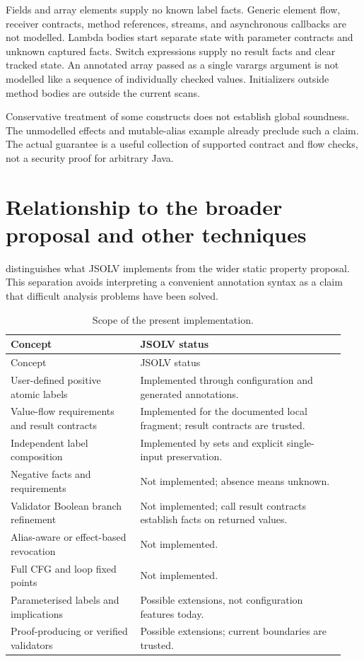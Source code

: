 \documentclass[11pt]{article}
\newcommand{\jsolv}{\textsc{JSOLV}}
\begin{document}
Fields and array elements supply no known label facts. Generic element flow,
receiver contracts, method references, streams, and asynchronous callbacks are
not modelled. Lambda bodies start separate state with parameter contracts and
unknown captured facts. Switch expressions supply no result facts and clear
tracked state. An annotated array passed as a single varargs argument is not
modelled like a sequence of individually checked values. Initializers outside
method bodies are outside the current scans.

Conservative treatment of some constructs does not establish global soundness.
The unmodelled effects and mutable-alias example already preclude such a claim.
The actual guarantee is a useful collection of supported contract and flow
checks, not a security proof for arbitrary Java.

\section{Relationship to the broader proposal and other techniques}

 distinguishes what \jsolv{} implements from the wider static
property proposal. This separation avoids interpreting a convenient annotation
syntax as a claim that difficult analysis problems have been solved.

\begin{longtable}{@{}>{\raggedright\arraybackslash}p{0.36\linewidth}
                      >{\raggedright\arraybackslash}p{0.58\linewidth}@{}}
\caption{Scope of the present implementation.}\label{tab:scope}\\
\toprule
Concept & JSOLV status \\
\midrule
\endfirsthead
\toprule Concept & JSOLV status \\ \midrule
\endhead
User-defined positive atomic labels & Implemented through configuration and generated annotations. \\
Value-flow requirements and result contracts & Implemented for the documented local fragment; result contracts are trusted. \\
Independent label composition & Implemented by sets and explicit single-input preservation. \\
Negative facts and requirements & Not implemented; absence means unknown. \\
Validator Boolean branch refinement & Not implemented; call result contracts establish facts on returned values. \\
Alias-aware or effect-based revocation & Not implemented. \\
Full CFG and loop fixed points & Not implemented. \\
Parameterised labels and implications & Possible extensions, not configuration features today. \\
Proof-producing or verified validators & Possible extensions; current boundaries are trusted. \\
\bottomrule
\end{longtable}
\end{document}
